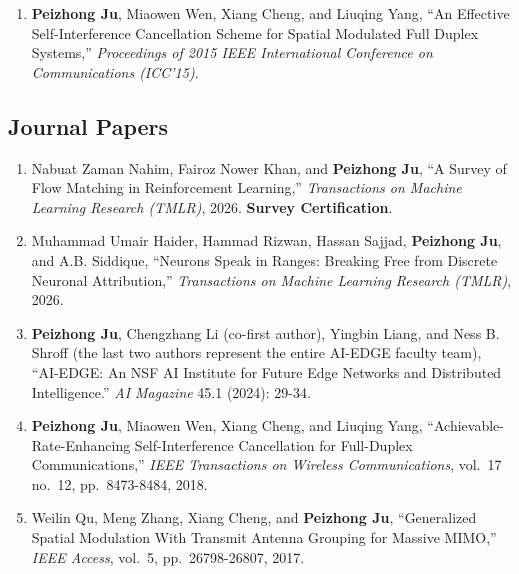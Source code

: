 \documentclass[10pt,letter]{article}
\begin{document}
\begin{small}
\begin{enumerate}
    \item \textbf{Peizhong Ju}, Miaowen Wen, Xiang Cheng, and Liuqing Yang, ``An Effective Self-Interference Cancellation Scheme for Spatial Modulated Full Duplex Systems,'' \textit{Proceedings of 2015 IEEE International Conference on Communications (ICC'15)}.
\end{enumerate}

\vspace{-0.4cm}
\subsection*{Journal Papers}

\begin{enumerate}

    \item Nabuat Zaman Nahim, Fairoz Nower Khan, and \textbf{Peizhong Ju}, ``A Survey of Flow Matching in Reinforcement Learning,'' \textit{Transactions on Machine Learning Research (TMLR)}, 2026. \textbf{Survey Certification}.

    \item Muhammad Umair Haider, Hammad Rizwan, Hassan Sajjad, \textbf{Peizhong Ju}, and A.B. Siddique, ``Neurons Speak in Ranges: Breaking Free from Discrete Neuronal Attribution,'' \textit{Transactions on Machine Learning Research (TMLR)}, 2026.

    \item \textbf{Peizhong Ju}, Chengzhang Li (co-first author), Yingbin Liang, and Ness B. Shroff (the last two authors represent the entire AI-EDGE faculty team), ``AI-EDGE: An NSF AI Institute for Future Edge Networks and Distributed Intelligence.'' \textit{AI Magazine} 45.1 (2024): 29-34.

    \item \textbf{Peizhong Ju}, Miaowen Wen, Xiang Cheng, and Liuqing Yang, ``Achievable-Rate-Enhancing Self-Interference Cancellation for Full-Duplex Communications,'' \textit{IEEE Transactions on Wireless Communications}, vol.~17 no.~12, pp.~8473-8484, 2018.
    
    \item Weilin Qu, Meng Zhang, Xiang Cheng, and \textbf{Peizhong Ju}, ``Generalized Spatial Modulation With Transmit Antenna Grouping for Massive MIMO,'' \textit{IEEE Access}, vol.~5, pp.~26798-26807, 2017.
\end{enumerate}




\end{small}
\end{document}
